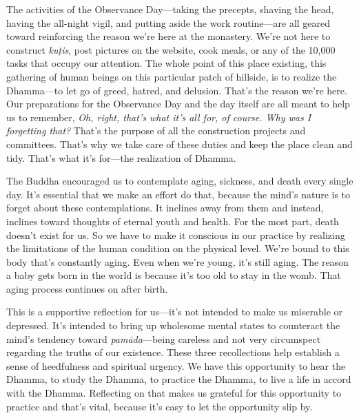 The activities of the Observance Day---taking the precepts, shaving the 
head, having the all-night vigil, and putting aside the work 
routine---are all geared toward reinforcing the reason we're here at 
the monastery. We're not here to construct \emph{kuṭis}, post 
pictures on the website, cook meals, or any of the 10,000 tasks that 
occupy our attention. The whole point of this place existing, this 
gathering of human beings on this particular patch of hillside, is to 
realize the Dhamma---to let go of greed, hatred, and delusion. That's 
the reason we're here. Our preparations for the Observance Day and the 
day itself are all meant to help us to remember, \emph{Oh, right, 
that's what it's all for, of course. Why was I forgetting that?} That's 
the purpose of all the construction projects and committees. That's why 
we take care of these duties and keep the place clean and tidy. That's 
what it's for---the realization of Dhamma.


The Buddha encouraged us to contemplate aging, sickness, and death 
every single day. It's essential that we make an effort do that, 
because the mind's nature is to forget about these contemplations. It 
inclines away from them and instead, inclines toward thoughts of 
eternal youth and health. For the most part, death doesn't exist for 
us. So we have to make it conscious in our practice by realizing the 
limitations of the human condition on the physical level. We're bound 
to this body that's constantly aging. Even when we're young, it's still 
aging. The reason a baby gets born in the world is because it's too old 
to stay in the womb. That aging process continues on after birth.

This is a supportive reflection for us---it's not intended to make us 
miserable or depressed. It's intended to bring up wholesome mental 
states to counteract the mind's tendency toward \emph{pamāda}---being 
careless and not very circumspect regarding the truths of our 
existence. These three recollections help establish a sense of 
heedfulness and spiritual urgency. We have this opportunity to hear the 
Dhamma, to study the Dhamma, to practice the Dhamma, to live a life in 
accord with the Dhamma. Reflecting on that makes us grateful for this 
opportunity to practice and that's vital, because it's easy to let the 
opportunity slip by.

